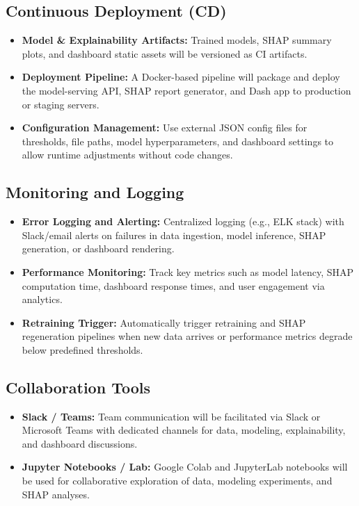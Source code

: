 \documentclass[15pt]{article}
\begin{document}
\subsection{Continuous Deployment (CD)}

\begin{itemize}
    \item \textbf{Model & Explainability Artifacts:} Trained models, SHAP summary plots, and dashboard static assets will be versioned as CI artifacts.
    \item \textbf{Deployment Pipeline:} A Docker-based pipeline will package and deploy the model-serving API, SHAP report generator, and Dash app to production or staging servers.
    \item \textbf{Configuration Management:} Use external JSON config files for thresholds, file paths, model hyperparameters, and dashboard settings to allow runtime adjustments without code changes.
\end{itemize}

\subsection{Monitoring and Logging}

\begin{itemize}
    \item \textbf{Error Logging and Alerting:} Centralized logging (e.g., ELK stack) with Slack/email alerts on failures in data ingestion, model inference, SHAP generation, or dashboard rendering.
    \item \textbf{Performance Monitoring:} Track key metrics such as model latency, SHAP computation time, dashboard response times, and user engagement via analytics.
    \item \textbf{Retraining Trigger:} Automatically trigger retraining and SHAP regeneration pipelines when new data arrives or performance metrics degrade below predefined thresholds.
\end{itemize}

\subsection{Collaboration Tools}

\begin{itemize}
    \item \textbf{Slack / Teams:} Team communication will be facilitated via Slack or Microsoft Teams with dedicated channels for data, modeling, explainability, and dashboard discussions.
    \item \textbf{Jupyter Notebooks / Lab:} Google Colab and JupyterLab notebooks will be used for collaborative exploration of data, modeling experiments, and SHAP analyses.
\end{itemize}
\end{document}
